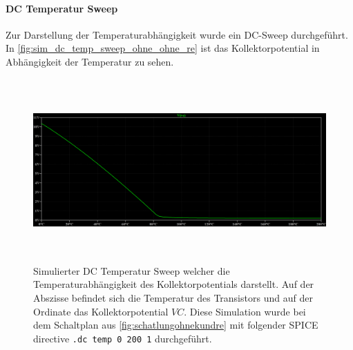\documentclass[12pt,english,ngerman]{scrartcl}
\begin{document}
\paragraph{DC Temperatur Sweep}
Zur Darstellung der Temperaturabhängigkeit wurde ein DC-Sweep durchgeführt. In \autoref{fig:sim_dc_temp_sweep_ohne_ohne_re} ist das Kollektorpotential in Abhängigkeit der Temperatur zu sehen.
\begin{figure}[H]
  \centering
    \includegraphics[width=\linewidth, height=7cm]{./figures/ohnekondundre/dcsweepkollektorpotR2auf10kohm5mv.png }
    \caption[Simulierter DC Temperatur Sweep ohne
    Überbrückungskondensator und ohne Emitterwiderstand]{Simulierter DC Temperatur Sweep welcher die
      Temperaturabhängigkeit des Kollektorpotentials darstellt. Auf der
      Abszisse befindet sich die Temperatur des Transistors und auf der Ordinate
      das Kollektorpotential $VC$. Diese Simulation wurde bei dem
      Schaltplan aus \autoref{fig:schatlungohnekundre} mit folgender SPICE
      directive \texttt{.dc temp 0 200 1} durchgeführt.
  }
  \label{fig:sim_dc_temp_sweep_ohne_ohne_re}
\end{figure}
\end{document}
